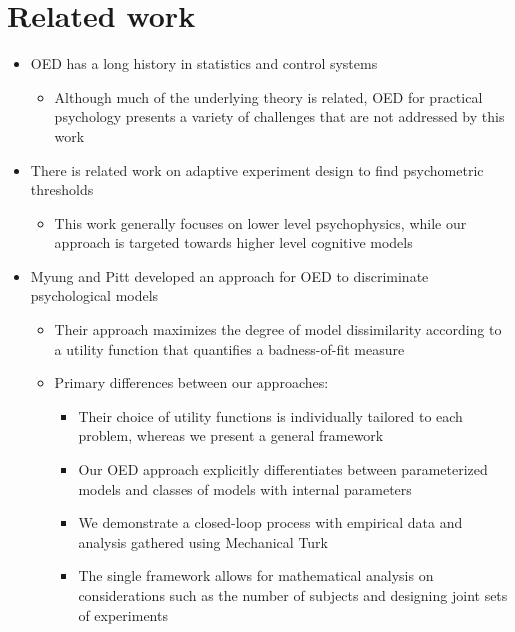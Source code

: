 \documentclass[11pt]{article}
\begin{document}
\section{Related work}
    \begin{itemize}
        \item OED has a long history in statistics and control systems
            \begin{itemize}
                \item Although much of the underlying theory is related, OED for practical psychology presents a variety of challenges that are not addressed by this work
            \end{itemize}
        \item There is related work on adaptive experiment design to find psychometric thresholds
            \begin{itemize}
                \item This work generally focuses on lower level psychophysics, while our approach is targeted towards higher level cognitive models
            \end{itemize}
        \item Myung and Pitt developed an approach for OED to discriminate psychological models
            \begin{itemize}
                \item Their approach maximizes the degree of model dissimilarity according to a utility function that quantifies a badness-of-fit measure
                \item Primary differences between our approaches:
                    \begin{itemize}
                        \item Their choice of utility functions is individually tailored to each problem, whereas we present a general framework 
                        \item Our OED approach explicitly differentiates between parameterized models and classes of models with internal parameters
                        \item We demonstrate a closed-loop process with empirical data and analysis gathered using Mechanical Turk
                        \item The single framework allows for mathematical analysis on considerations such as the number of subjects and designing joint sets of experiments
                    \end{itemize}
            \end{itemize}
    \end{itemize}
\end{document}
